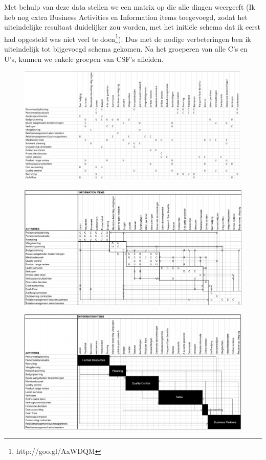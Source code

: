 \documentclass{article}
\begin{document}
Met behulp van deze data stellen we een matrix op die alle dingen weergeeft (Ik heb nog extra Business Activities en Information items toegevoegd, zodat het uiteindelijke resultaat duidelijker zou worden, met het initi\"ele schema dat ik eerst had opgesteld was niet veel te doen\footnote{http://goo.gl/AxWDQM}). Dus met de nodige verbeteringen ben ik uiteindelijk tot bijgevoegd schema gekomen. Na het groeperen van alle C's en U's, kunnen we enkele groepen van CSF's afleiden.

\begin{figure}[h]
\centering
\includegraphics[scale=0.56]{image1}
\end{figure}
\begin{figure}[ht]
\centering
\includegraphics[scale=0.56]{image2}
\end{figure}
\begin{figure}[ht]
\centering
\includegraphics[scale=0.56]{image3}
\end{figure}
\end{document}
